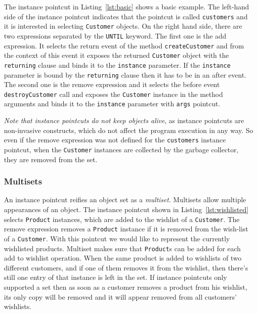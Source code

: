 \documentclass{acm_proc_article-sp}
\begin{document}
The instance pointcut in Listing~\ref{lst:basic} shows a basic example. The left-hand side of the instance pointcut indicates that the pointcut is called \lstinline{customers} and it is interested in selecting \lstinline{Customer} objects. 
On the right hand side, there are two expressions separated by the \lstinline{UNTIL} keyword. The first one is the add expression. It selects the return event of the method \lstinline{createCustomer} and from the context of this event it exposes the returned \lstinline{Customer} object with the \lstinline{returning} clause and binds it to the \lstinline{instance} parameter. If the \lstinline{instance} parameter is bound by the \lstinline{returning} clause then it has to be in an after event. The second one is the remove expression and it selects the before event \lstinline{destroyCustomer} call and exposes the \lstinline{Customer} instance in the method arguments and binds it to the \lstinline{instance} parameter with \lstinline{args} pointcut.


\emph{Note that instance pointcuts do not keep objects alive}, as instance pointcuts are non-invasive constructs, which do not affect the program execution in any way. So even if the remove expression was not defined for the \lstinline{customers} instance pointcut, when the \lstinline{Customer} instances are collected by the garbage collector, they are removed from the set. 


\subsubsection{Multisets}
An instance pointcut reifies an object set as a \emph{multiset}. Multisets allow multiple appearances of an object. The instance pointcut shown in Listing~\ref{lst:wishlisted} selects \lstinline{Product} instances, which are added to the wishlist of a \lstinline{Customer}. The remove expression removes a \lstinline{Product} instance if it is removed from the wish-list of a \lstinline{Customer}. With this pointcut we would like to represent the currently wishlisted products. Multiset makes sure that \lstinline{Product}s can be added for each add to wishlist operation. When the same product is added to wishlists of two different customers, and if one of them removes it from the wishlist, then there's still one entry of that instance is left in the set.  If instance pointcuts only supported a set then as soon as a customer removes a product from his wishlist, its only copy will be removed and it will appear removed from all customers' wishlists.
\end{document}
